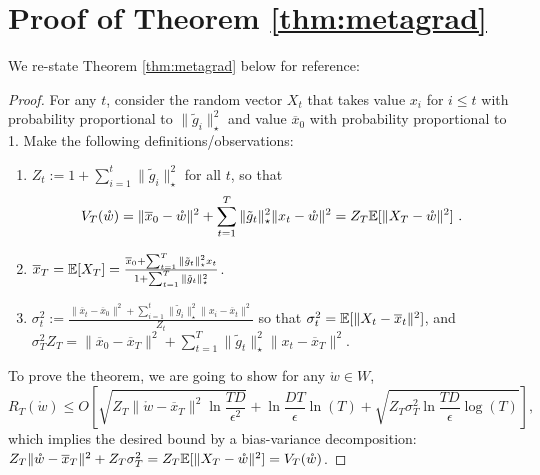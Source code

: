 \documentclass[12pt]{colt2018} %
\newcommand{\w}{\mathring{w}}
\begin{document}
\section{Proof of Theorem \ref{thm:metagrad}}\label{sec:metagradproof}
We re-state Theorem \ref{thm:metagrad} below for reference:
\metagrad*
\begin{proof}
For any $t$, consider the random vector $X_t$ that takes value $x_{i}$ for $i \le t$ with probability proportional to $\|\tilde{g}_{i}\|_\star ^2$ and value $\overline{x}_0$ with probability proportional to 1. Make the following definitions/observations:
\begin{enumerate}
\item $Z_t := 1 + \sum_{i=1}^t \|\tilde{g}_i\|_\star ^2$ for all $t$, so that 
\begin{align*}
V_T(\w)
= \|\overline{x}_0-\w\|^2 +  \sum_{t=1}^T \|\tilde{g}_t\|_\star^2\|x_t-\w\|^2
= Z_T \E[\|X_T-\w\|^2]~.
\end{align*}
\item $\overline{x}_T = \mathbb{E}[X_T] = \frac{\overline{x}_0+\sum_{t=1}^T \|\tilde{g}_t\|_\star ^2 x_t}{1 + \sum_{t=1}^T \|\tilde g_t\|_\star ^2}$.
\item $\sigma^2_t := \frac{\|\overline{x}_t-\overline{x}_0\|^2+\sum_{i=1}^t\|\tilde{g}_{i}\|^2_\star  \| x_{i}-\overline{x}_t\|^2}{Z_t}$ so that $\sigma^2_t = \mathbb{E}[\|X_t-\overline{x}_t\|^2]$, and $\sigma^2_T Z_T = \|\overline{x}_0-\overline{x}_T\|^2+\sum_{t=1}^T\|\tilde g_t\|_\star ^2 \|x_t-\overline{x}_T\|^2$.
\end{enumerate}

To prove the theorem, we are going to show for any $\w\in W$,
\begin{equation}
\label{eqn:biasvariancetarget}
R_T(\w) 
\le O\left[\sqrt{Z_T\|\w-\overline{x}_T\|^2\ln \frac{TD}{\epsilon^2}} + \ln\frac{D T}{\epsilon}\ln(T) + \sqrt{Z_T\sigma_T^2 \ln \frac{TD}{\epsilon}\log(T)}\right],
\end{equation}
which implies the desired bound by a bias-variance decomposition: $Z_T\|\w-\overline{x}_T\|^2 + Z_T\sigma^2_T = Z_T\E[\|X_T-\w\|^2]=  V_T(\w)$.


\end{proof}
\end{document}
